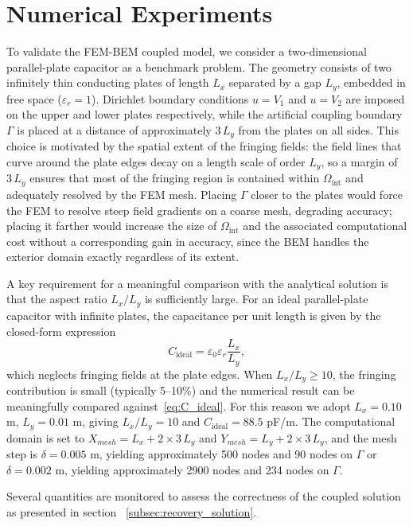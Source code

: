 \documentclass[11pt,onecolumn]{article}
\begin{document}
\section{Numerical Experiments}

To validate the FEM-BEM coupled model, we consider a two-dimensional parallel-plate capacitor 
as a benchmark problem. The geometry consists of two infinitely thin conducting plates of length 
$L_x$ separated by a gap $L_y$, embedded in free space ($\varepsilon_r = 1$). Dirichlet boundary 
conditions $u = V_1$ and $u = V_2$ are imposed on the upper and lower plates respectively, while the artificial coupling boundary $\Gamma$ is placed at a distance of approximately $3\,L_y$ 
from the plates on all sides. This choice is motivated by the spatial extent of the fringing 
fields: the field lines that curve around the plate edges decay on a length scale of order 
$L_y$, so a margin of $3\,L_y$ ensures that most of the fringing region is contained within 
$\Omega_{\text{int}}$ and adequately resolved by the FEM mesh. Placing $\Gamma$ closer to 
the plates would force the FEM to resolve steep field gradients on a coarse mesh, degrading 
accuracy; placing it farther would increase the size of $\Omega_{\text{int}}$ and the 
associated computational cost without a corresponding gain in accuracy, since the BEM handles 
the exterior domain exactly regardless of its extent.

A key requirement for a meaningful comparison with the analytical solution is that the aspect 
ratio $L_x/L_y$ is sufficiently large. For an ideal parallel-plate capacitor with infinite plates, 
the capacitance per unit length is given by the closed-form expression
\begin{equation}
    C_{\text{ideal}} = \varepsilon_0 \varepsilon_r \frac{L_x}{L_y},
    \label{eq:C_ideal}
\end{equation}
which neglects fringing fields at the plate edges. When $L_x/L_y \geq 10$, the fringing 
contribution is small (typically 5--10\%) and the numerical result can be meaningfully compared 
against~\eqref{eq:C_ideal}. For this reason we adopt $L_x = 0.10$ m, $L_y = 0.01$ m, giving 
$L_x/L_y = 10$ and $C_{\text{ideal}} = 88.5$ pF/m. The computational domain is set to 
$X_{mesh} = L_x + 2 \times 3\,L_y$ and $Y_{mesh} = L_y + 2 \times 3\,L_y$, and the mesh step is 
$\delta = 0.005$ m, yielding approximately 500 nodes and 90 nodes on $\Gamma$ or $\delta = 0.002$ m, yielding approximately 2900 nodes and 234 nodes on $\Gamma$.

Several quantities are monitored to assess the correctness of the coupled solution as presented in section ~\ref{subsec:recovery_solution}.
\end{document}
